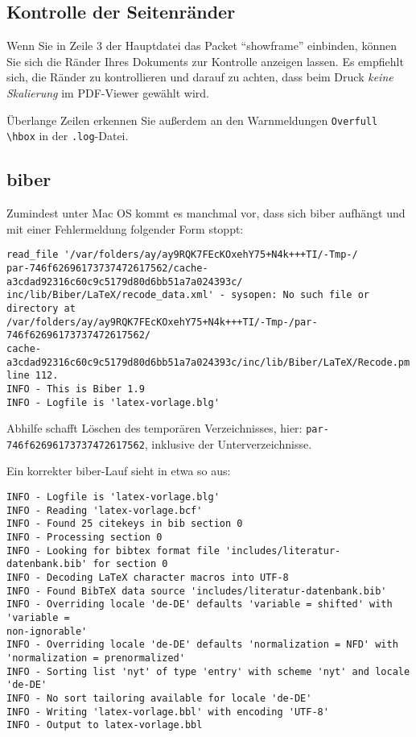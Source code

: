 \subsection{Kontrolle der Seitenränder}
Wenn Sie in Zeile 3 der Hauptdatei das Packet \enquote{showframe} einbinden, können Sie sich die Ränder Ihres Dokuments zur Kontrolle anzeigen lassen. Es empfiehlt sich, die Ränder zu kontrollieren und darauf zu achten, dass beim Druck \emph{keine Skalierung} im PDF-Viewer gewählt wird.  

Überlange Zeilen erkennen Sie außerdem an den Warnmeldungen \verb|Overfull \hbox| in der \verb|.log|-Datei.

\subsection{biber}
Zumindest unter Mac OS kommt es manchmal vor, dass sich biber aufhängt und mit einer Fehlermeldung folgender Form stoppt:

{\small
\begin{verbatim}
read_file '/var/folders/ay/ay9RQK7FEcKOxehY75+N4k+++TI/-Tmp-/
par-746f62696173737472617562/cache-a3cdad92316c60c9c5179d80d6bb51a7a024393c/
inc/lib/Biber/LaTeX/recode_data.xml' - sysopen: No such file or directory at 
/var/folders/ay/ay9RQK7FEcKOxehY75+N4k+++TI/-Tmp-/par-746f62696173737472617562/
cache-a3cdad92316c60c9c5179d80d6bb51a7a024393c/inc/lib/Biber/LaTeX/Recode.pm 
line 112.
INFO - This is Biber 1.9
INFO - Logfile is 'latex-vorlage.blg'
\end{verbatim}
}

Abhilfe schafft Löschen des temporären Verzeichnisses, hier: \verb|par-746f62696173737472617562|, inklusive der Unterverzeichnisse.

Ein korrekter biber-Lauf sieht in etwa so aus:
{\small
\begin{verbatim}
INFO - Logfile is 'latex-vorlage.blg'
INFO - Reading 'latex-vorlage.bcf'
INFO - Found 25 citekeys in bib section 0
INFO - Processing section 0
INFO - Looking for bibtex format file 'includes/literatur-datenbank.bib' for section 0
INFO - Decoding LaTeX character macros into UTF-8
INFO - Found BibTeX data source 'includes/literatur-datenbank.bib'
INFO - Overriding locale 'de-DE' defaults 'variable = shifted' with 'variable = 
non-ignorable'
INFO - Overriding locale 'de-DE' defaults 'normalization = NFD' with 
'normalization = prenormalized'
INFO - Sorting list 'nyt' of type 'entry' with scheme 'nyt' and locale 'de-DE'
INFO - No sort tailoring available for locale 'de-DE'
INFO - Writing 'latex-vorlage.bbl' with encoding 'UTF-8'
INFO - Output to latex-vorlage.bbl 
\end{verbatim}
}

